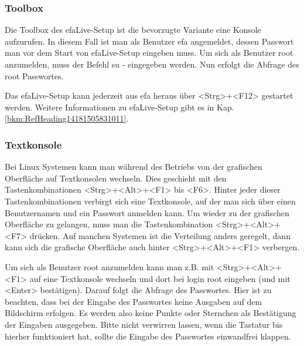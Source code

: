 \documentclass[a4paper,12pt,twoside]{article}
\begin{document}
\bigskip

\subsubsection[Toolbox]{Toolbox}
\label{bkm:RefHeading138641045300}Die
{\textquotedbl}Toolbox{\textquotedbl} des efaLive-Setup ist die
bevorzugte Variante eine Konsole aufzurufen. In diesem Fall ist man als
Benutzer {\textquotedbl}efa{\textquotedbl} angemeldet, dessen Passwort
man vor dem Start von efaLive-Setup eingeben muss. Um sich als Benutzer
{\textquotedbl}root{\textquotedbl} anzumelden, muss der Befehl
{\textquotedbl}su -{\textquotedbl} eingegeben werden. Nun erfolgt die
Abfrage des {\textquotedbl}root{\textquotedbl} Passwortes.


\bigskip

Das efaLive-Setup kann jederzeit aus efa heraus über
{\textless}Strg{\textgreater}+{\textless}F12{\textgreater} gestartet
werden. Weitere Informationen zu efaLive-Setup gibt es in Kap.
\ref{bkm:RefHeading14181505831011}.

\subsubsection[Textkonsole]{Textkonsole}
\label{bkm:RefHeading14811703288044}Bei Linux Systemen kann man während
des Betriebs von der grafischen Oberfläche auf Textkonsolen wechseln.
Dies geschieht mit den Tastenkombinationen
{\textless}Strg{\textgreater}+{\textless}Alt{\textgreater}+{\textless}F1{\textgreater}
bis {\textless}F6{\textgreater}. Hinter jeder dieser
Tastenkombinationen verbirgt sich eine Textkonsole, auf der man sich
über einen Benutzernamen und ein Passwort anmelden kann. Um wieder zu
der grafischen Oberfläche zu gelangen, muss man die Tastenkombination
{\textless}Strg{\textgreater}+{\textless}Alt{\textgreater}+{\textless}F7{\textgreater}
drücken. Auf manchen Systemen ist die Verteilung anders geregelt, dann
kann sich die grafische Oberfläche auch hinter
{\textless}Strg{\textgreater}+{\textless}Alt{\textgreater}+{\textless}F1{\textgreater}
verbergen.


\bigskip

Um sich als Benutzer {\textquotedbl}root{\textquotedbl} anzumelden kann
man z.B. mit
{\textless}Strg{\textgreater}+{\textless}Alt{\textgreater}+{\textless}F1{\textgreater}
auf eine Textkonsole wechseln und dort bei
{\textquotedbl}login{\textquotedbl} {\textquotedbl}root{\textquotedbl}
eingeben (und mit {\textless}Enter{\textgreater} bestätigen). Darauf
folgt die Abfrage des Passwortes. Hier ist zu beachten, dass bei der
Eingabe des Passwortes keine Ausgaben auf dem Bildschirm erfolgen. Es
werden also keine Punkte oder Sternchen als Bestätigung der Eingaben
ausgegeben. Bitte nicht verwirren lassen, wenn die Tastatur bis hierher
funktioniert hat, sollte die Eingabe des Passwortes einwandfrei
klappen.
\end{document}
